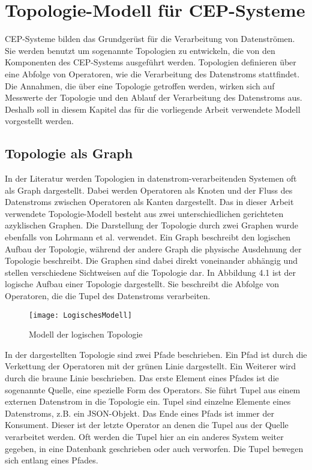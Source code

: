 \chapter{Topologie-Modell für CEP-Systeme}

CEP-Systeme bilden das Grundgerüst für die Verarbeitung von Datenströmen.
Sie werden benutzt um sogenannte Topologien zu entwickeln, die von den Komponenten des CEP-Systems ausgeführt werden.
Topologien definieren über eine Abfolge von Operatoren, wie die Verarbeitung des Datenstroms stattfindet.
Die Annahmen, die über eine Topologie getroffen werden, wirken sich auf Messwerte der Topologie und den Ablauf der Verarbeitung des Datenstroms aus.
Deshalb soll in diesem Kapitel das für die vorliegende Arbeit verwendete Modell vorgestellt werden.

\section{Topologie als Graph}

In der Literatur werden Topologien in datenstrom-verarbeitenden Systemen oft als Graph dargestellt.
Dabei werden Operatoren als Knoten und der Fluss des Datenstroms zwischen Operatoren als Kanten dargestellt.
Das in dieser Arbeit verwendete Topologie-Modell besteht aus zwei unterschiedlichen gerichteten azyklischen Graphen.
Die Darstellung der Topologie durch zwei Graphen wurde ebenfalls von Lohrmann et al. \cite{lohrmann_elastic_2015} verwendet.
Ein Graph beschreibt den logischen Aufbau der Topologie, während der andere Graph die physische Ausdehnung der Topologie beschreibt.
Die Graphen sind dabei direkt voneinander abhängig und stellen verschiedene Sichtweisen auf die Topologie dar.
In Abbildung 4.1 ist der logische Aufbau einer Topologie dargestellt. 
Sie beschreibt die Abfolge von Operatoren, die die Tupel des Datenstroms verarbeiten.

\begin{figure}
\texttt{[image: LogischesModell]}
\caption{Modell der logischen Topologie}
\end{figure}

In der dargestellten Topologie sind zwei Pfade beschrieben.
Ein Pfad ist durch die Verkettung der Operatoren mit der grünen Linie dargestellt.
Ein Weiterer wird durch die braune Linie beschrieben.
Das erste Element eines Pfades ist die sogenannte Quelle, eine spezielle Form des Operators.
Sie führt Tupel aus einem externen Datenstrom in die Topologie ein.
Tupel sind einzelne Elemente eines Datenstroms, z.B. ein JSON-Objekt.
Das Ende eines Pfads ist immer der Konsument.
Dieser ist der letzte Operator an denen die Tupel aus der Quelle verarbeitet werden. 
Oft werden die Tupel hier an ein anderes System weiter gegeben, in eine Datenbank geschrieben oder auch verworfen.
Die Tupel bewegen sich entlang eines Pfades.


